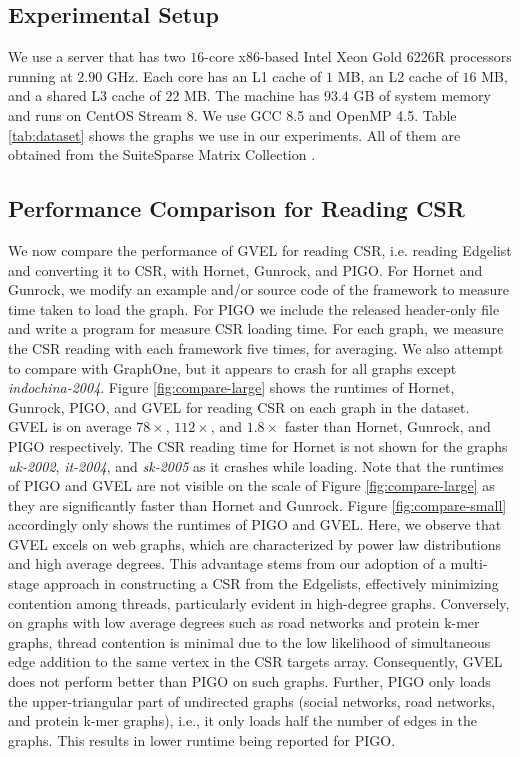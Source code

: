 \subsection{Experimental Setup}
\label{sec:setup}

We use a server that has two $16$-core x86-based Intel Xeon Gold 6226R processors running at $2.90$ GHz. Each core has an L1 cache of $1$ MB, an L2 cache of $16$ MB, and a shared L3 cache of $22$ MB. The machine has $93.4$ GB of system memory and runs on CentOS Stream 8. We use GCC 8.5 and OpenMP 4.5. Table \ref{tab:dataset} shows the graphs we use in our experiments. All of them are obtained from the SuiteSparse Matrix Collection \cite{kolodziej2019suitesparse}.






\subsection{Performance Comparison for Reading CSR}

We now compare the performance of GVEL for reading CSR, i.e. reading Edgelist and converting it to CSR, with Hornet, Gunrock, and PIGO. For Hornet and Gunrock, we modify an example and/or source code of the framework to measure time taken to load the graph. For PIGO we include the released header-only file and write a program for measure CSR loading time. For each graph, we measure the CSR reading with each framework five times, for averaging. We also attempt to compare with GraphOne, but it appears to crash for all graphs except \textit{indochina-2004}. Figure \ref{fig:compare-large} shows the runtimes of Hornet, Gunrock, PIGO, and GVEL for reading CSR on each graph in the dataset. GVEL is on average $78\times$, $112\times$, and $1.8\times$ faster than Hornet, Gunrock, and PIGO respectively. The CSR reading time for Hornet is not shown for the graphs \textit{uk-2002}, \textit{it-2004}, and \textit{sk-2005} as it crashes while loading. Note that the runtimes of PIGO and GVEL are not visible on the scale of Figure \ref{fig:compare-large} as they are significantly faster than Hornet and Gunrock. Figure \ref{fig:compare-small} accordingly only shows the runtimes of PIGO and GVEL. Here, we observe that GVEL excels on web graphs, which are characterized by power law distributions and high average degrees. This advantage stems from our adoption of a multi-stage approach in constructing a CSR from the Edgelists, effectively minimizing contention among threads, particularly evident in high-degree graphs. Conversely, on graphs with low average degrees such as road networks and protein k-mer graphs, thread contention is minimal due to the low likelihood of simultaneous edge addition to the same vertex in the CSR targets array. Consequently, GVEL does not perform better than PIGO on such graphs. Further, PIGO only loads the upper-triangular part of undirected graphs (social networks, road networks, and protein k-mer graphs), i.e., it only loads half the number of edges in the graphs. This results in lower runtime being reported for PIGO.


